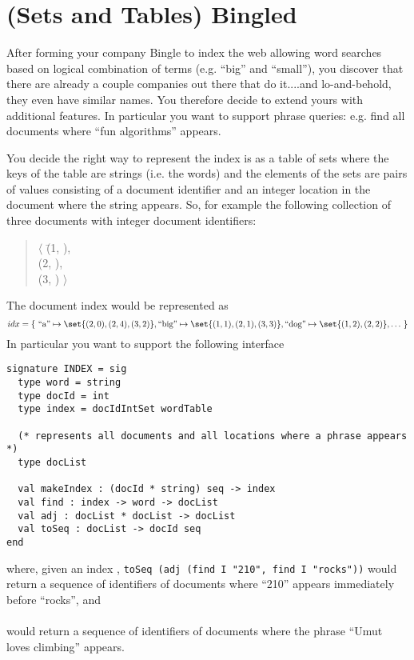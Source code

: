 \section{(Sets and Tables) Bingled}


After forming your company Bingle to index the web allowing word
searches based on logical combination of terms (e.g. ``big'' and
``small''), you discover that there are already a couple companies out
there that do it....and lo-and-behold, they even have similar names.
You therefore decide to extend yours with additional features.  In
particular you want to support phrase queries: e.g. find all
documents where ``fun algorithms'' appears.

\begin{gram}
You decide the right way to represent the index is as a table of sets
where the keys of the table are strings (i.e. the words) and the
elements of the sets are pairs of values consisting of a document
identifier and an integer location in the document where the string
appears.  So, for example the following collection of three documents
with integer document identifiers:

\begin{quote}
\begin{tabbing}
 $\langle$
  \=(1, ), \\
  \>(2, ),\\
  \>(3, ) $\rangle$
\end{tabbing}
\end{quote}
\end{gram}

The document index would be represented as
\[
idx = \{~\text{``a''} \mapsto \set{(2,0),(2,4),(3,2)},
        \text{``big''} \mapsto \set{(1,1),(2,1),(3,3)},
        \text{``dog''} \mapsto \set{(1,2),(2,2)},
        \ldots~\}
\]
%
In particular you want to support the following interface
\begin{lstlisting}[numbers=none]
signature INDEX = sig
  type word = string
  type docId = int
  type index = docIdIntSet wordTable
  
  (* represents all documents and all locations where a phrase appears *)
  type docList

  val makeIndex : (docId * string) seq -> index    
  val find : index -> word -> docList
  val adj : docList * docList -> docList
  val toSeq : docList -> docId seq 
end
\end{lstlisting}
%
where, given an index ,
\texttt{toSeq (adj (find I "210", find I "rocks"))} would return a sequence of
identifiers of documents
where ``210'' appears immediately before ``rocks'', and \\
%
\\
%
would return a sequence of identifiers of documents
where the phrase ``Umut loves climbing'' appears.

